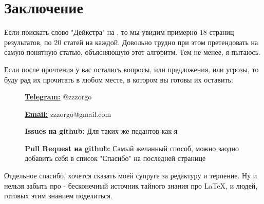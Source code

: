 \setlength{\headwidth}{145mm}
\vspace*{\fill}
\section*{Заключение}

Если поискать слово "Дейкстра" на , то мы увидим примерно 18 страниц результатов, по 20 статей на каждой. Довольно трудно при этом претендовать на самую понятную статью, объясняющую этот алгоритм. Тем не менее, я пытаюсь.

Если после прочтения у вас остались вопросы, или предложения, или угрозы, то буду рад их прочитать в любом месте, в котором вы готовы их оставить:

\begin{description}
    \item[]{\href{https://t.me/zzzorgo}{\bfseries \ul{Telegram:}} @zzzorgo}
    \item[]{\href{mailto:zzzorgo@gmail.com}{\bfseries \ul{Email:}} zzzorgo@gmail.com}
    \item[]{
        {\bfseries Issues на github:} Для таких же педантов как я
    }
    \item[]{
        {\bfseries Pull Request на github:} Самый желанный способ, можно заодно добавить себя в список "Спасибо" на последней странице
    }
\end{description}

Отдельное спасибо, хочется сказать моей супруге за редактуру и терпение. Ну и нельзя забыть про  - бесконечный источник тайного знания про \LaTeX, и людей, готовых этим знанием поделиться.

\vspace*{\fill}
\restoregeometry
\clearpage
